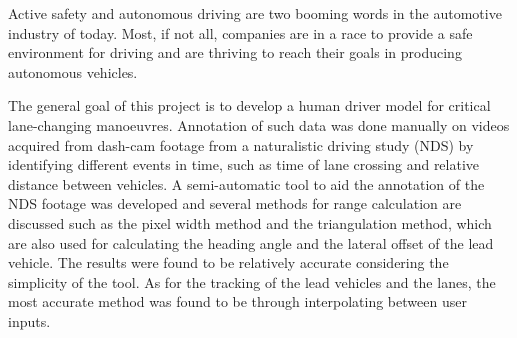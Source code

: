 Active safety and autonomous driving are two booming words in the automotive industry of today. Most, if not all, companies are in a race to provide a safe environment for driving and are thriving to reach their goals in producing autonomous vehicles. 

The general goal of this project is to develop a human driver model for critical lane-changing manoeuvres. Annotation of such data was done manually on videos acquired from dash-cam footage from a naturalistic driving study (NDS) by identifying different events in time, such as time of lane crossing and relative distance between vehicles. A semi-automatic tool to aid the annotation of the NDS footage was developed and several methods for range calculation are discussed such as the pixel width method and the triangulation method, which are also used for calculating the heading angle and the lateral offset of the lead vehicle. The results were found to be relatively accurate considering the simplicity of the tool.  As for the tracking of the lead vehicles and the lanes, the most accurate method was found to be through interpolating between user inputs.